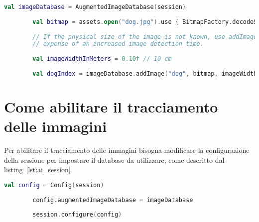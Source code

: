 \documentclass[crop=false, class=book]{standalone}
\begin{document}
	\begin{center}
		\begin{minipage}{0.95\textwidth}
		\begin{lstlisting}[caption={Descrizione del listing.}, label={lst:ai_dbruntime}, language=Kotlin]
		val imageDatabase = AugmentedImageDatabase(session)
		
		val bitmap = assets.open("dog.jpg").use { BitmapFactory.decodeStream(it) }
		
		// If the physical size of the image is not known, use addImage(String, Bitmap) instead, at the
		// expense of an increased image detection time.
		
		val imageWidthInMeters = 0.10f // 10 cm
		
		val dogIndex = imageDatabase.addImage("dog", bitmap, imageWidthInMeters)
		\end{lstlisting}
		\end{minipage}
	\end{center}
	
	\section{Come abilitare il tracciamento delle immagini}
	Per abilitare il tracciamento delle immagini bisogna modificare la configurazione della sessione per impostare il database da utilizzare, come descritto dal listing~\vref{lst:ai_session}
	
	\begin{center}
		\begin{minipage}{0.95\textwidth}
		\begin{lstlisting}[caption={Descrizione del listing.}, label={lst:ai_session}, language=Kotlin]
		val config = Config(session)
		
		config.augmentedImageDatabase = imageDatabase
		
		session.configure(config)
		\end{lstlisting}
		\end{minipage}
	\end{center}
\end{document}
